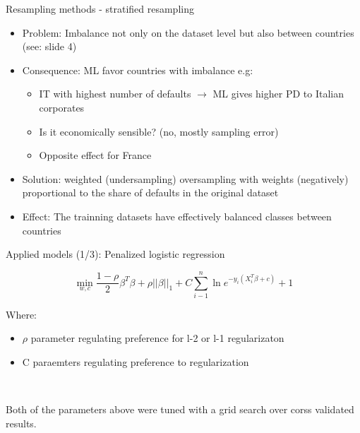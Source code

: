 \documentclass{beamer}
\begin{document}
\begin{frame}{Resampling methods - stratified resampling}

\begin{itemize}
\item Problem: Imbalance not only on the dataset level but also between countries (see: slide 4)
\item Consequence: ML favor countries with imbalance e.g:

\begin{itemize}
	\item IT with highest number of defaults $\rightarrow$ ML gives higher PD to Italian corporates
	\item Is it economically sensible? (no, mostly sampling error)
	\item Opposite effect for France
\end{itemize}

\item Solution: weighted (undersampling) oversampling with weights (negatively) proportional to the share of defaults in the original dataset
\item Effect: The trainning datasets have effectively balanced classes between countries
\end{itemize}
\end{frame}


\begin{frame}{Applied models (1/3): Penalized logistic regression}

$$\min_{w,c} \frac{1-\rho}{2} \beta^{T}\beta + \rho ||\beta||_1 + C \sum_{i-1}^n \ln e^{-y_i(X_i^T \beta + c)}+1$$

Where:

\begin{itemize}
\item $\rho$ parameter regulating preference for l-2 or l-1 regularizaton
\item C paraemters regulating preference to regularization
\end{itemize}

\

Both of the parameters above were tuned with a grid search over corss validated results.


\end{frame}
\end{document}
